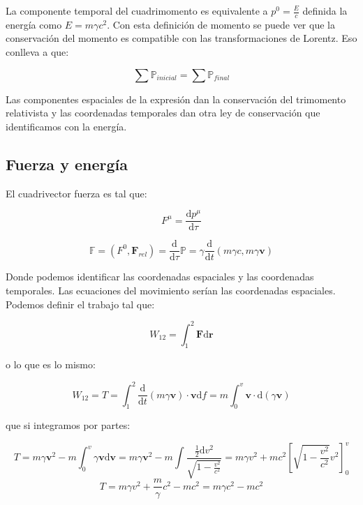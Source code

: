 \documentclass[12pt,a4paper]{book}
\newcommand{\D}{\mathrm{d}}
\begin{document}
La componente temporal del cuadrimomento es equivalente a $p^0 = \frac{E}{c}$ definida la energía como $E = m \gamma c^2$. Con esta definición de momento se puede ver que la conservación del momento es compatible con las transformaciones de Lorentz. Eso conlleva a que:

\begin{equation}
\sum \mathbb{P}_{inicial} = \sum \mathbb{P}_{final}
\end{equation}

Las componentes espaciales de la expresión dan la conservación del trimomento relativista y las coordenadas temporales dan otra ley de conservación que identificamos con la energía.

\subsection{Fuerza y energía}

El cuadrivector fuerza es tal que:

\begin{equation}
F^\mu = \dfrac{\D p^\mu}{\D \tau}
\end{equation}

\begin{equation}
\mathbb{F} = (F^0, \mathbf{F}_{rel}) = \dfrac{\D}{\D \tau} \mathbb{P} = \gamma \dfrac{\D }{\D t} (m \gamma c, m \gamma \mathbf{v}) 
\end{equation}

Donde podemos identificar las coordenadas espaciales y las coordenadas temporales. Las ecuaciones del movimiento serían las coordenadas espaciales. Podemos definir el trabajo tal que:

\begin{equation}
W_{12} = \int_1^2 \mathbf{F} \D \mathbf{r}
\end{equation}

o lo que es lo mismo:

\begin{equation}
W_{12} = T = \int_1^2 \dfrac{\D }{\D t} (m  \gamma \mathbf{v}) \cdot \mathbf{v} \D f = m \int_0^{v} \mathbf{v} \cdot \D (\gamma \mathbf{v}) 
\end{equation}

que si integramos por partes:

$$ T = m \gamma  \mathbf{v}^2 - m \int_0^v \gamma \mathbf{v} \D \mathbf{v} =  m \gamma  \mathbf{v}^2  - m \int \dfrac{\frac{1}{2} \D v^2}{\sqrt{1- \frac{v^2}{c^2}}} =  m \gamma  v^2  + m c^2 \left[   \sqrt{1-\frac{v^2}{c^2}} v^2 \right]^v_0  $$ 
$$
T = m \gamma v^2 + \dfrac{m}{\gamma} c^2- m c^2  =  m \gamma c^2 - m c^2
$$
\end{document}
